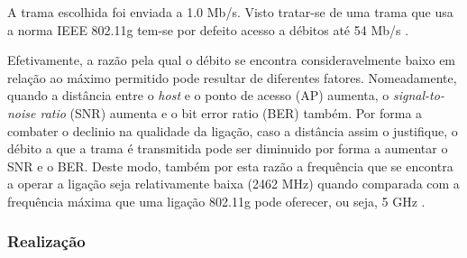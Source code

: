 \documentclass{llncs}
\begin{document}
A trama escolhida foi enviada a 1.0 Mb/s. Visto tratar-se de uma trama que usa a norma IEEE 802.11g tem-se por defeito acesso a débitos até 54 Mb/s \cite{computer_networking}.

Efetivamente, a razão pela qual o débito se encontra consideravelmente baixo em relação ao máximo permitido pode resultar de diferentes fatores. Nomeadamente, quando a distância entre o \textit{host} e o ponto de acesso (AP) aumenta, o \textit{signal-to-noise ratio} (SNR) aumenta e o bit error ratio (BER) também. Por forma a combater o declinio na qualidade da ligação, caso a distância assim o justifique, o débito a que a trama é transmitida pode ser diminuido por forma a aumentar o SNR e o BER. Deste modo, também por esta razão a frequência que se encontra a operar a ligação seja relativamente baixa (2462 MHz) quando comparada com a frequência máxima que uma ligação 802.11g pode oferecer, ou seja, 5 GHz \cite{computer_networking} \cite{wiki:ber} \cite{wiki:snr}.

\subsubsection{Realização}\rule[-10pt]{0pt}{10pt}\\
\end{document}
